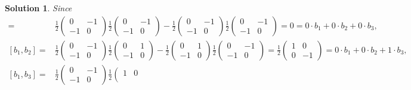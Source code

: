\documentclass[UTF8,10pt,a4paper]{article}
\theoremstyle{Problem}
\theoremstyle{Solution}
\newtheorem*{sol}{Solution}
\begin{document}
\begin{sol}
    Since
    \begin{align}
        [b_1,b_1]=&\frac{1}{2}\left(\begin{matrix}
            0&-1\\
            -1&0
        \end{matrix}\right)\frac{1}{2}\left(\begin{matrix}
            0&-1\\
            -1&0
        \end{matrix}\right)-\frac{1}{2}\left(\begin{matrix}
            0&-1\\
            -1&0
        \end{matrix}\right)\frac{1}{2}\left(\begin{matrix}
            0&-1\\
            -1&0
        \end{matrix}\right)=0=0\cdot b_1+0\cdot b_2+0\cdot b_3,\\
        [b_1,b_2]=&\frac{1}{2}\left(\begin{matrix}
            0&-1\\
            -1&0
        \end{matrix}\right)\frac{1}{2}\left(\begin{matrix}
            0&1\\
            -1&0
        \end{matrix}\right)-\frac{1}{2}\left(\begin{matrix}
            0&1\\
            -1&0
        \end{matrix}\right)\frac{1}{2}\left(\begin{matrix}
            0&-1\\
            -1&0
        \end{matrix}\right)=\frac{1}{2}\left(\begin{matrix}
            1&0\\
            0&-1
        \end{matrix}\right)=0\cdot b_1+0\cdot b_2+1\cdot b_3,\\
        [b_1,b_3]=&\frac{1}{2}\left(\begin{matrix}
            0&-1\\
            -1&0
        \end{matrix}\right)\frac{1}{2}\left(\begin{matrix}
            1&0\\

\end{matrix}
\end{align}
\end{sol}
\end{document}
